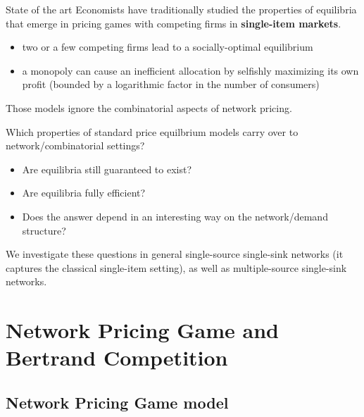 \documentclass{beamer}
\begin{document}
\begin{frame}{State of the art}
Economists have traditionally studied the properties of equilibria that emerge
in pricing games with competing firms in \textbf{single-item markets}.

\begin{itemize}
\item two or a few competing firms lead to a socially-optimal
equilibrium
\item a monopoly can cause an inefficient allocation
by selfishly maximizing its own profit (bounded by
a logarithmic factor in the number of consumers)
\end{itemize}

Those models ignore the combinatorial aspects of network pricing.
\end{frame}


\begin{frame}
Which properties of standard price equilbrium models carry over to network/combinatorial settings?
\begin{itemize}
\item Are equilibria still guaranteed to exist? 
\item Are equilibria fully efficient?
\item Does the answer depend in an interesting way on the network/demand structure?
\end{itemize}

We investigate these questions in general single-source single-sink networks (it captures the classical single-item setting), as well as multiple-source single-sink networks.
\end{frame}



\section{Network Pricing Game and Bertrand Competition}

\subsection{Network Pricing Game model}
\end{document}
